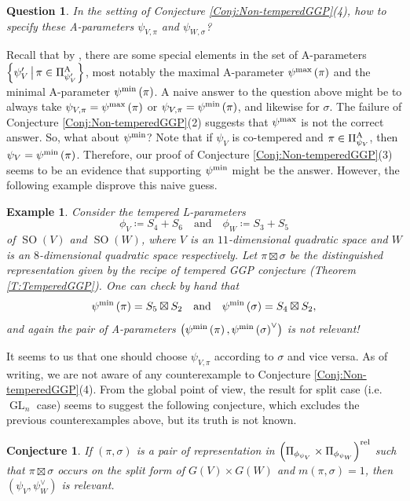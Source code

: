 \documentclass[11pt,letterpaper]{amsart}
\theoremstyle{plain}
\newcounter{theorem}[section]
\numberwithin{theorem}{section}
\numberwithin{equation}{subsection}
\newtheorem{Conj}[theorem]{Conjecture}
\newtheorem{Que}[theorem]{Question}
\newtheorem{Exm}[theorem]{Example}
\theoremstyle{remark}
\newcommand{\GL}{\operatorname{GL}}
\newcommand{\SO}{\operatorname{SO}}
\def\AP{\Pi^{\rm A}} %
\def\rel{{\rm rel}} %
\begin{document}
\begin{Que}
In the setting of Conjecture \ref{Conj:Non-temperedGGP}(4), how to specify these A-parameters $\psi_{V,\pi}$ and $\psi_{W,\sigma}$?     
\end{Que}

\vskip 5pt

Recall that by \cite{MR4912257}, there are some special elements in the set of A-parameters $\left\{\psi'_V\,\big|\,\pi\in\AP_{\psi'_V}\right\}$, most notably the maximal A-parameter $\psi^{\rm max}\left(\pi\right)$ and the minimal A-parameter $\psi^{\rm min}\left(\pi\right)$. A naive answer to the question above might be to always take $\psi_{V,\pi}=\psi^{\rm max}\left(\pi\right)$ or $\psi_{V,\pi}=\psi^{\rm min}\left(\pi\right)$, and likewise for $\sigma$. The failure of Conjecture \ref{Conj:Non-temperedGGP}(2) suggests that $\psi^{\rm max}$ is not the correct answer. So, what about $\psi^{\rm min}$? Note that if $\psi_V$ is co-tempered and $\pi\in\AP_{\psi_V}$, then $\psi_V = \psi^{\rm min}\left(\pi\right)$. Therefore, our proof of Conjecture \ref{Conj:Non-temperedGGP}(3) seems to be an evidence that supporting $\psi^{\rm min}$ might be the answer. However, the following example disprove this naive guess. 

\begin{Exm}
Consider the tempered L-parameters
\[
    \phi_V \coloneqq S_4 + S_6 \quad \text{and} \quad \phi_W \coloneqq S_3 + S_5
\]
of $\SO\left(V\right)$ and $\SO\left(W\right)$, where $V$ is an $11$-dimensional quadratic space and $W$ is an $8$-dimensional quadratic space respectively. Let $\pi\boxtimes\sigma$ be the distinguished representation given by the recipe of tempered GGP conjecture (Theorem \ref{T:TemperedGGP}). One can check by hand that
\[
    \psi^{\rm min}\left(\pi\right) = S_5\boxtimes S_2 \quad \text{and} \quad \psi^{\rm min}\left(\sigma\right) = S_4\boxtimes S_2,
\]
and again the pair of A-parameters $\left(\psi^{\rm min}\left(\pi\right),\psi^{\rm min}\left(\sigma\right)^\vee\right)$ is not relevant!   
\end{Exm}

It seems to us that one should choose $\psi_{V,\pi}$ according to $\sigma$ and vice versa. As of writing, we are not aware of any counterexample to Conjecture \ref{Conj:Non-temperedGGP}(4). From the global point of view, the result for split case (i.e. $\GL_n$ case) seems to suggest the following conjecture, which excludes the previous counterexamples above, but its truth is not known.

\begin{Conj}
    If \(\left(\pi,\sigma\right)\) is a pair of representation in \(\left(\Pi_{\phi_{\psi_V}}\times\Pi_{\phi_{\psi_W}}\right)^{\rel}\) such that \(\pi\boxtimes \sigma\) occurs on the split form of \(G\left(V\right)\times G\left(W\right)\) and \(m(\pi,\sigma)=1\), then \(\left(\psi_V,\psi^{\vee}_W\right)\) is relevant.
\end{Conj}
\end{document}
